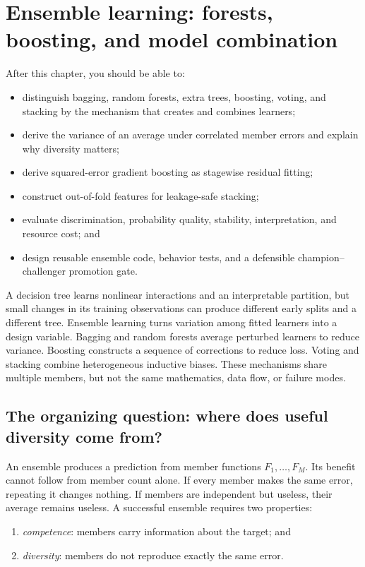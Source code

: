 \chapter{Ensemble learning: forests, boosting, and model combination}
\label{ch:ensembles}

\begin{learningobjectives}
After this chapter, you should be able to:
\begin{itemize}
  \item distinguish bagging, random forests, extra trees, boosting, voting, and
  stacking by the mechanism that creates and combines learners;
  \item derive the variance of an average under correlated member errors and
  explain why diversity matters;
  \item derive squared-error gradient boosting as stagewise residual fitting;
  \item construct out-of-fold features for leakage-safe stacking;
  \item evaluate discrimination, probability quality, stability,
  interpretation, and resource cost; and
  \item design reusable ensemble code, behavior tests, and a defensible
  champion--challenger promotion gate.
\end{itemize}
\end{learningobjectives}

\begin{chapterconnection}
A decision tree learns nonlinear interactions and an interpretable partition,
but small changes in its training observations can produce different early
splits and a different tree. Ensemble learning turns variation among fitted
learners into a design variable. Bagging and random forests average perturbed
learners to reduce variance. Boosting constructs a sequence of corrections to
reduce loss. Voting and stacking combine heterogeneous inductive biases. These
mechanisms share multiple members, but not the same mathematics, data flow, or
failure modes.
\end{chapterconnection}

\section{The organizing question: where does useful diversity come from?}

An ensemble produces a prediction from member functions
$F_1,\dots,F_M$. Its benefit cannot follow from member count alone. If every
member makes the same error, repeating it changes nothing. If members are
independent but useless, their average remains useless. A successful ensemble
requires two properties:
\begin{enumerate}
  \item \emph{competence}: members carry information about the target; and
  \item \emph{diversity}: members do not reproduce exactly the same error.
\end{enumerate}

